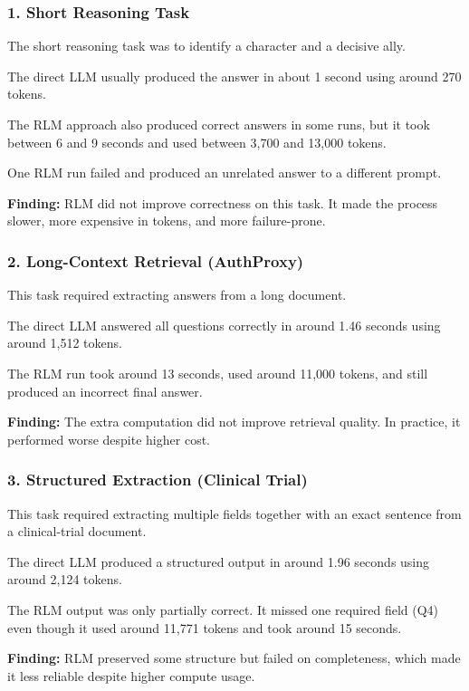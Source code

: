 \documentclass{article}
\begin{document}
\subsubsection{1. Short Reasoning Task}

The short reasoning task was to identify a character and a decisive ally.

The direct LLM usually produced the answer in about 1 second using around 270 tokens.

The RLM approach also produced correct answers in some runs, but it took between 6 and 9 seconds and used between 3{,}700 and 13{,}000 tokens.

One RLM run failed and produced an unrelated answer to a different prompt.

\textbf{Finding:} RLM did not improve correctness on this task. It made the process slower, more expensive in tokens, and more failure-prone.

\subsubsection{2. Long-Context Retrieval (AuthProxy)}

This task required extracting answers from a long document.

The direct LLM answered all questions correctly in around 1.46 seconds using around 1{,}512 tokens.

The RLM run took around 13 seconds, used around 11{,}000 tokens, and still produced an incorrect final answer.

\textbf{Finding:} The extra computation did not improve retrieval quality. In practice, it performed worse despite higher cost.

\subsubsection{3. Structured Extraction (Clinical Trial)}

This task required extracting multiple fields together with an exact sentence from a clinical-trial document.

The direct LLM produced a structured output in around 1.96 seconds using around 2{,}124 tokens.

The RLM output was only partially correct. It missed one required field (Q4) even though it used around 11{,}771 tokens and took around 15 seconds.

\textbf{Finding:} RLM preserved some structure but failed on completeness, which made it less reliable despite higher compute usage.
\end{document}
